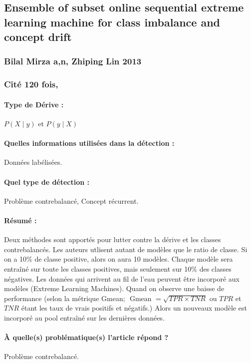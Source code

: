 \documentclass[11pt,a4paper]{report}
\begin{document}
\subsection{Ensemble of subset online sequential extreme learning machine for class imbalance and concept drift}
\subsubsection{Bilal Mirza a,n, Zhiping Lin  2013}

\subsubsection{Cité 120 fois, }

\paragraph{Type de Dérive :} $P(X\mid y)$ et $P(y \mid X)$ 
\paragraph{Quelles informations utilisées dans la détection :} Données labélisées.
\paragraph{Quel type de détection :} Problème contrebalancé, Concept récurrent.

\paragraph{Résumé :} Deux méthodes sont apportés pour lutter contre la dérive et les classes contrebalancés. Les auteurs utlisent autant de modèles que le ratio de classe. Si on a 10\% de classe positive, alors on aura 10 modèles. Chaque modèle sera entraîné sur toute les classes positives, mais seulement sur 10\% des classes négatives. 
Les données qui arrivent au fil de l'eau peuvent être incorporé aux modèles (Extreme Learning Machines). Quand on observe une baisse de performance (selon la métrique Gmean; $\text { Gmean }=\sqrt{T P R \times T N R}$ ou $TPR$ et $TNR$ étant les taux de vrais positifs et négatifs.) Alors un nouveaux modèle est incorporé au pool entraîné sur les dernières données.


\paragraph{À quelle(s) problématique(s) l'article répond ?} Problème contrebalancé.
\end{document}
